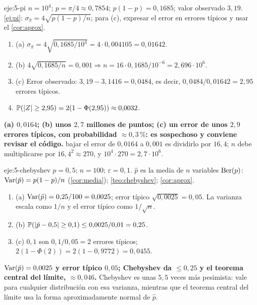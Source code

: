 \begin{solucion}{eje:5-pi}
\datos $n=10^{4}$; $p=\pi/4\approx 0{,}7854$; $p(1-p)=0{,}1685$; valor observado $3{,}19$.
\planteamiento \cref{ej:pi}: $\sigma_{\hat\pi}=4\sqrt{p(1-p)/n}$; para (c), expresar el error en errores típicos y usar el \cref{cor:aprox}.
\pasos
\begin{enumerate}[label=\arabic*.]
  \item (a) $\sigma_{\hat\pi}=4\sqrt{0{,}1685/10^{4}}=4\cdot 0{,}004105=0{,}01642$.
  \item (b) $4\sqrt{0{,}1685/n}=0{,}001\Rightarrow n=16\cdot 0{,}1685/10^{-6}=2{,}696\cdot 10^{6}$.
  \item (c) Error observado: $3{,}19-3{,}1416=0{,}0484$, es decir, $0{,}0484/0{,}01642=2{,}95$ errores típicos.
  \item $\mathbb{P}(\lvert Z\rvert\ge 2{,}95)=2(1-\Phi(2{,}95))\approx 0{,}0032$.
\end{enumerate}
\resultado \textbf{(a) $0{,}0164$; (b) unos $2{,}7$ millones de puntos; (c) un error de unos $2{,}9$ errores típicos, con probabilidad $\approx 0{,}3\,\%$: es sospechoso y conviene revisar el código.}
\comprobacion bajar el error de $0{,}0164$ a $0{,}001$ es dividirlo por $16{,}4$; $n$ debe multiplicarse por $16{,}4^{2}\approx 270$, y $10^{4}\cdot 270=2{,}7\cdot 10^{6}$.
\end{solucion}

\begin{solucion}{eje:5-chebyshev}
\datos $p=0{,}5$; $n=100$; $\varepsilon=0{,}1$.
\planteamiento $\hat p$ es la media de $n$ variables $\operatorname{Ber}(p)$: $\operatorname{Var}(\hat p)=p(1-p)/n$ (\cref{cor:media}); \cref{teo:chebyshev}; \cref{cor:aprox}.
\pasos
\begin{enumerate}[label=\arabic*.]
  \item (a) $\operatorname{Var}(\hat p)=0{,}25/100=0{,}0025$; error típico $\sqrt{0{,}0025}=0{,}05$. La varianza escala como $1/n$ y el error típico como $1/\sqrt n$.
  \item (b) $\mathbb{P}(\lvert\hat p-0{,}5\rvert\ge 0{,}1)\le 0{,}0025/0{,}01=0{,}25$.
  \item (c) $0{,}1$ son $0{,}1/0{,}05=2$ errores típicos; $2(1-\Phi(2))=2(1-0{,}9772)=0{,}0455$.
\end{enumerate}
\resultado \textbf{$\operatorname{Var}(\hat p)=0{,}0025$ y error típico $0{,}05$; Chebyshev da $\le 0{,}25$ y el teorema central del límite, $\approx 0{,}046$.}
\comprobacion Chebyshev es unas $5{,}5$ veces más pesimista: vale para cualquier distribución con esa varianza, mientras que el teorema central del límite usa la forma aproximadamente normal de $\hat p$.
\end{solucion}

